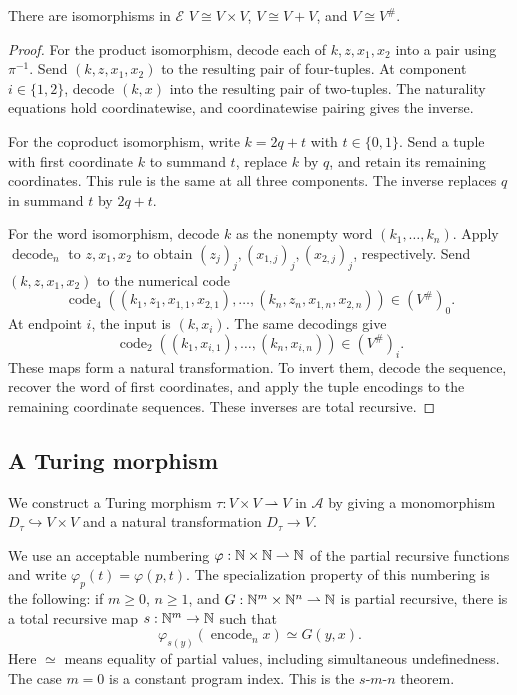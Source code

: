 \begin{lemma}\label{lem:fork-frames}
There are isomorphisms in $\mathcal E$
$V\cong V\times V$, $V\cong V+V$, and $V\cong V^\#$.
\end{lemma}
\begin{proof}
For the product isomorphism, decode each of $k,z,x_1,x_2$ into a
pair using $\pi^{-1}$. Send $(k,z,x_1,x_2)$ to the resulting pair
of four-tuples. At component $i\in\{1,2\}$, decode $(k,x)$ into
the resulting pair of two-tuples. The naturality equations hold
coordinatewise, and coordinatewise pairing gives the inverse.

For the coproduct isomorphism, write $k=2q+t$ with
$t\in\{0,1\}$. Send a tuple with first coordinate $k$ to
summand $t$, replace $k$ by $q$, and retain its remaining
coordinates. This rule is the same at all three components.
The inverse replaces $q$ in summand $t$ by $2q+t$.

For the word isomorphism, decode $k$ as the nonempty word
$(k_1,\ldots,k_n)$. Apply $\operatorname{decode}_n$ to $z,x_1,x_2$
to obtain $(z_j)_j,(x_{1,j})_j,(x_{2,j})_j$, respectively. Send $(k,z,x_1,x_2)$ to the numerical code
\[
 \operatorname{code}_4
 ((k_1,z_1,x_{1,1},x_{2,1}),\ldots,(k_n,z_n,x_{1,n},x_{2,n}))
 \in(V^\#)_0.
\]
At endpoint $i$, the input is $(k,x_i)$. The same decodings give
\[
 \operatorname{code}_2((k_1,x_{i,1}),\ldots,(k_n,x_{i,n}))\in(V^\#)_i.
\]
These maps form a natural transformation. To invert them, decode
the sequence, recover the word of first coordinates, and apply
the tuple encodings to the remaining coordinate sequences.
These inverses are total recursive.
\end{proof}

\subsection{A Turing morphism}\label{app:fork-turing}

We construct a Turing morphism $\tau:V\times V\rightharpoonup V$
in $\mathcal A$ by giving a monomorphism $D_\tau\hookrightarrow V\times V$
and a natural transformation $D_\tau\to V$.

We use an acceptable numbering
$\varphi:\mathbb N\times\mathbb N\rightharpoonup\mathbb N$ of the partial recursive
functions and write $\varphi_p(t)=\varphi(p,t)$.
The specialization property of this numbering is the following:
if $m\geq0$, $n\geq1$, and
$G:\mathbb N^m\times\mathbb N^n\rightharpoonup\mathbb N$ is partial recursive,
there is a total recursive map $s:\mathbb N^m\to\mathbb N$ such that
\[
 \varphi_{s(y)}(\operatorname{encode}_n x)\simeq G(y,x).
\]
Here $\simeq$ means equality of partial values,
including simultaneous undefinedness. The case $m=0$ is a
constant program index. This is the $s$-$m$-$n$ theorem.

